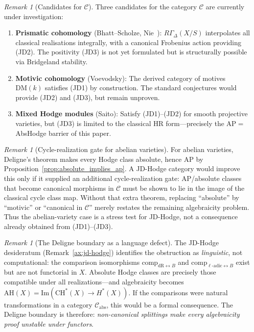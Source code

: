 \documentclass[aps,prd,twocolumn,superscriptaddress,nofootinbib]{revtex4-2}
\theoremstyle{definition}
\theoremstyle{remark}
\newtheorem{remark}[theorem]{Remark}
\begin{document}
\begin{remark}[Candidates for $\mathcal{C}$]\label{rem:candidates-C}
Three candidates for the category $\mathcal{C}$ are currently under investigation:
\begin{enumerate}
\item \textbf{Prismatic cohomology} (Bhatt--Scholze, Nie~\cite{Nie2021}): $R\Gamma_\Delta(X/S)$ interpolates all classical realisations integrally, with a canonical Frobenius action providing (JD2). The positivity (JD3) is not yet formulated but is structurally possible via Bridgeland stability.
\item \textbf{Motivic cohomology} (Voevodsky): The derived category of motives $\mathrm{DM}(k)$ satisfies (JD1) by construction. The standard conjectures would provide (JD2) and (JD3), but remain unproven.
\item \textbf{Mixed Hodge modules} (Saito): Satisfy (JD1)--(JD2) for smooth projective varieties, but (JD3) is limited to the classical HR form---precisely the AP$=$AbsHodge barrier of this paper.
\end{enumerate}
\end{remark}

\begin{remark}[Cycle-realization gate for abelian varieties]\label{rem:jd-abelian}
For abelian varieties, Deligne's theorem makes every Hodge class absolute, hence AP by Proposition~\ref{prop:absolute_implies_ap}. A JD-Hodge category would improve this only if it supplied an additional cycle-realization gate: AP/absolute classes that become canonical morphisms in $\mathcal{C}$ must be shown to lie in the image of the classical cycle class map. Without that extra theorem, replacing ``absolute'' by ``motivic'' or ``canonical in $\mathcal{C}$'' merely restates the remaining algebraicity problem. Thus the abelian-variety case is a stress test for JD-Hodge, not a consequence already obtained from (JD1)--(JD3).
\end{remark}

\begin{remark}[The Deligne boundary as a language defect]\label{rem:deligne-language}
The JD-Hodge desideratum (Remark~\ref{ax:jd-hodge}) identifies the obstruction as \emph{linguistic}, not computational: the comparison isomorphisms $\mathrm{comp}_{\mathrm{dR} \leftrightarrow B}$ and $\mathrm{comp}_{\ell\text{-adic} \leftrightarrow B}$ exist but are not functorial in $X$. Absolute Hodge classes are precisely those compatible under all realizations---and algebraicity becomes $\mathrm{AH}(X) = \mathrm{Im}(\mathrm{CH}^*(X) \to H^*(X))$. If the comparisons were natural transformations in a category $\mathcal{C}_{\mathrm{abs}}$, this would be a formal consequence. The Deligne boundary is therefore: \emph{non-canonical splittings make every algebraicity proof unstable under functors}.
\end{remark}
\end{document}
